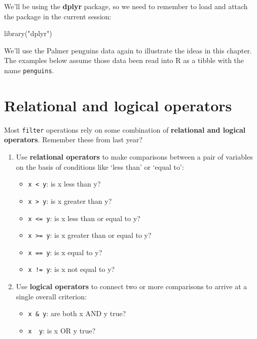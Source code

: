 \documentclass[
]{book}
\newenvironment{Shaded}{\begin{snugshade}}{\end{snugshade}}
\newcommand{\FunctionTok}[1]{\textcolor[rgb]{0.00,0.00,0.00}{#1}}
\newcommand{\NormalTok}[1]{#1}
\newcommand{\StringTok}[1]{\textcolor[rgb]{0.31,0.60,0.02}{#1}}
\providecommand{\tightlist}{%
  \setlength{\itemsep}{0pt}\setlength{\parskip}{0pt}}
\begin{document}
We'll be using the \textbf{dplyr} package, so we need to remember to load and attach the package in the current session:

\begin{Shaded}
\begin{Highlighting}[]
\FunctionTok{library}\NormalTok{(}\StringTok{"dplyr"}\NormalTok{)}
\end{Highlighting}
\end{Shaded}

We'll use the Palmer penguins data again to illustrate the ideas in this chapter. The examples below assume those data been read into R as a tibble with the name \texttt{penguins}.

\hypertarget{relational-and-logical-operators}{%
\section{Relational and logical operators}\label{relational-and-logical-operators}}

Most \texttt{filter} operations rely on some combination of \textbf{relational and logical operators}. Remember these from last year?

\begin{enumerate}
\def\labelenumi{\arabic{enumi}.}
\item
  Use \textbf{relational operators} to make comparisons between a pair of variables on the basis of conditions like `less than' or `equal to':

  \begin{itemize}
  \tightlist
  \item
    \texttt{x\ \textless{}\ y}: is x less than y?
  \item
    \texttt{x\ \textgreater{}\ y}: is x greater than y?
  \item
    \texttt{x\ \textless{}=\ y}: is x less than or equal to y?
  \item
    \texttt{x\ \textgreater{}=\ y}: is x greater than or equal to y?
  \item
    \texttt{x\ ==\ y}: is x equal to y?
  \item
    \texttt{x\ !=\ y}: is x not equal to y?
  \end{itemize}
\item
  Use \textbf{logical operators} to connect two or more comparisons to arrive at a single overall criterion:

  \begin{itemize}
  \tightlist
  \item
    \texttt{x\ \&\ y}: are both x AND y true?
  \item
    \texttt{x\ \textbar{}\ y}: is x OR y true?
  \end{itemize}
\end{enumerate}
\end{document}
